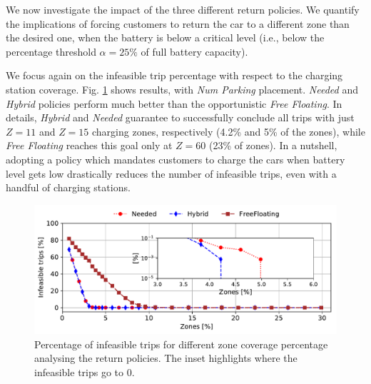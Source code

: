 \documentclass[review, letterpaper,3p, 11pt]{elsarticle}
\begin{document}
We now investigate the impact of the three different return policies. We quantify the implications of forcing customers to return the car to a different zone than the desired one, when the battery is below a critical level (i.e., below the percentage threshold $\alpha=25\%$ of full battery capacity).

We focus again on the infeasible trip percentage with respect to the charging station coverage.
Fig. \ref{fig:deathsVsZones_policy} shows results, with \textit{Num Parking} placement. \textit{Needed} and \textit{Hybrid} policies perform much better than the opportunistic \textit{Free Floating}.
In details, \textit{Hybrid} and \textit{Needed} guarantee to successfully conclude all trips with just $Z=11$ and $Z=15$ charging zones, respectively (4.2\% and 5\% of the zones), while \textit{Free Floating} reaches this goal only at $Z=60$  (23\% of zones).
In a nutshell, adopting a policy which mandates customers to charge the cars when battery level gets low drastically reduces the number of infeasible trips, even with a handful of  charging stations.

\begin{figure}[ht]
	\centering
	\includegraphics[width=0.95\columnwidth]{figures/Torino_H_N_FF_deaths_probs.pdf}
	\caption{Percentage of infeasible trips for different zone coverage percentage analysing the return policies. The inset highlights where the infeasible trips go to 0.}
	\label{fig:deathsVsZones_policy}
\end{figure}
\end{document}
